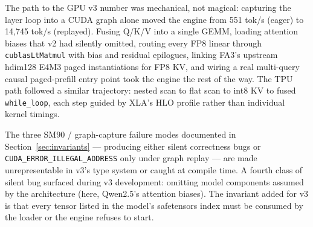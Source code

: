 The path to the GPU v3 number was mechanical, not magical: capturing the
layer loop into a CUDA graph alone moved the engine from 551 tok/s
(eager) to 14{,}745 tok/s (replayed). Fusing Q/K/V into a single GEMM,
loading attention biases that v2 had silently omitted, routing every FP8
linear through \texttt{cublasLtMatmul} with bias and residual epilogues,
linking FA3's upstream hdim128 E4M3 paged instantiations for FP8 KV,
and wiring a real multi-query causal paged-prefill entry point took
the engine the rest of the way. The TPU path followed a similar
trajectory: nested scan to flat scan to int8 KV to fused
\texttt{while\_loop}, each step guided by XLA's HLO profile rather
than individual kernel timings.

The three SM90 / graph-capture failure modes documented in
Section~\ref{sec:invariants} --- producing either silent correctness bugs
or \texttt{CUDA\_ERROR\_ILLEGAL\_ADDRESS} only under graph replay --- are
made unrepresentable in v3's type system or caught at compile time.
A fourth class of silent bug surfaced during v3 development: omitting
model components assumed by the architecture (here, Qwen2.5's attention
biases). The invariant added for v3 is that every tensor listed in the
model's safetensors index must be consumed by the loader or the engine
refuses to start.



